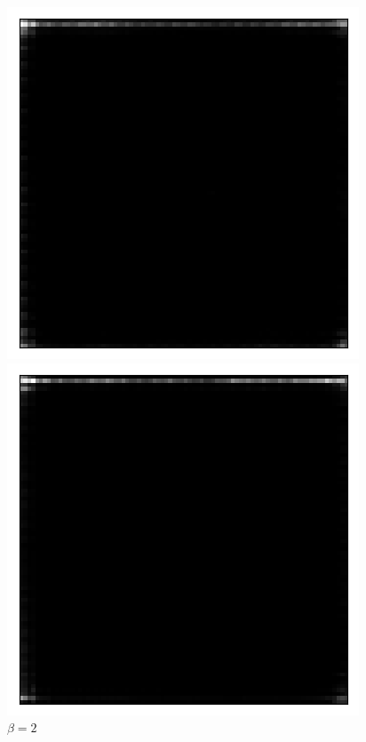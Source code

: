 \begin{figure}[h!]
\centering
\captionsetup{justification=centering}
\begin{multicols}{3}
    \includegraphics[scale=0.4]{figures/results/naive_average/beta_1_prior_sample_2.png}
    \caption{$\beta=1$}
    \includegraphics[scale=0.4]{figures/results/naive_average/beta_2_prior_sample_0.png}
    \caption{$\beta=2$}

\end{multicols}
\end{figure}
